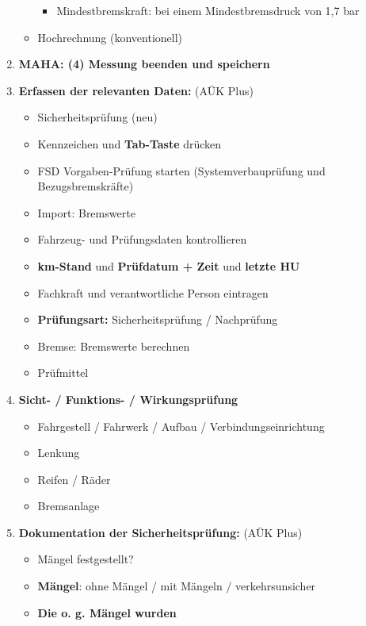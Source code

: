 \documentclass{vorlage-design-main}
\begin{document}
\begin{enumerate}
\begin{itemize}
    \begin{itemize}

    \item
      Mindestbremskraft: bei einem Mindestbremsdruck von 1,7 bar
    \end{itemize}
  \item
    Hochrechnung (konventionell)
  \end{itemize}
\item
  \textbf{MAHA: (4) Messung beenden und speichern}
\item
  \textbf{Erfassen der relevanten Daten:} (AÜK Plus)

  \begin{itemize}

  \item
    Sicherheitsprüfung (neu)
  \item
    Kennzeichen und \textbf{Tab-Taste} drücken
  \item
    FSD Vorgaben-Prüfung starten (Systemverbauprüfung und
    Bezugsbremskräfte)
  \item
    Import: Bremswerte
  \item
    Fahrzeug- und Prüfungsdaten kontrollieren
  \item
    \textbf{km-Stand} und \textbf{Prüfdatum + Zeit} und \textbf{letzte
    HU}
  \item
    Fachkraft und verantwortliche Person eintragen
  \item
    \textbf{Prüfungsart:} Sicherheitsprüfung / Nachprüfung
  \item
    Bremse: Bremswerte berechnen
  \item
    Prüfmittel
  \end{itemize}
\item
  \textbf{Sicht- / Funktions- / Wirkungsprüfung}

  \begin{itemize}

  \item
    Fahrgestell / Fahrwerk / Aufbau / Verbindungseinrichtung
  \item
    Lenkung
  \item
    Reifen / Räder
  \item
    Bremsanlage
  \end{itemize}
\item
  \textbf{Dokumentation der Sicherheitsprüfung:} (AÜK Plus)

  \begin{itemize}

  \item
    Mängel festgestellt?
  \item
    \textbf{Mängel}: ohne Mängel / mit Mängeln / verkehrsunsicher
  \item
    \textbf{Die o. g. Mängel wurden}


\end{itemize}
\end{enumerate}
\end{document}
